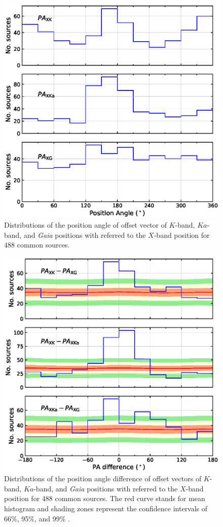 \documentclass{aa}
\begin{document}

    \begin{figure}[hbtp]
        \centering
        \includegraphics[width=0.7\columnwidth]{figs/pa-hist}
        \caption[]{\label{fig:pa-hist}
            Distributions of the position angle of offset vector of $K$-band, $Ka$-band, and \textit{Gaia} positions with referred to the $X$-band position for 488 common sources.
        }
    \end{figure}


    \begin{figure}[hbtp]
        \centering
        \includegraphics[width=0.7\columnwidth]{figs/pa-diff}
        \caption[]{\label{fig:pa-diff}
            Distributions of the position angle difference of offset vectors of $K$-band, $Ka$-band, and \textit{Gaia} positions with referred to the $X$-band position for 488 common sources.
            The red curve stands for mean histogram and shading zones represent the confidence intervals of 66\%, 95\%, and 99\% .
        }
    \end{figure}
\end{document}
